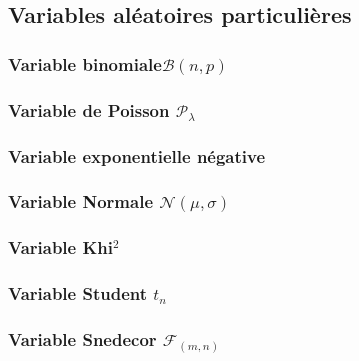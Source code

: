 \subsection{Variables aléatoires particulières}


\subsubsection{Variable binomiale$\mathcal{B}(n,p)$}
\subsubsection{Variable de Poisson $\mathcal{P}_\lambda$}
\subsubsection{Variable exponentielle négative}
\subsubsection{Variable Normale $\mathcal{N}(\mu,\sigma)$}
\subsubsection{Variable Khi$^2$}
\subsubsection{Variable Student $t_n$}
\subsubsection{Variable Snedecor $\mathcal{F}_{(m,n)}$}


